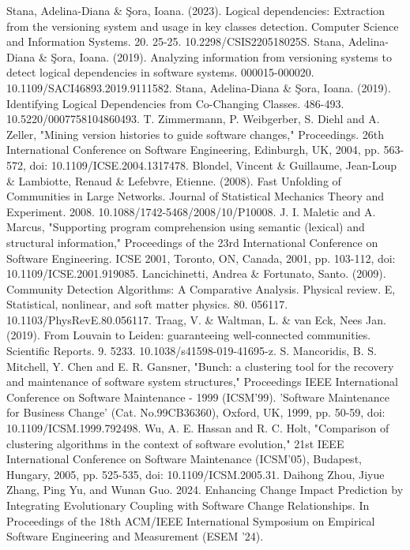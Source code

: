 \documentclass{ieeeaccess}
\begin{document}
\begin{thebibliography}{00}
 Stana, Adelina-Diana \& Şora, Ioana. (2023). Logical dependencies: Extraction from the versioning system and usage in key classes detection. Computer Science and Information Systems. 20. 25-25. 10.2298/CSIS220518025S. 
 Stana, Adelina-Diana \& Şora, Ioana. (2019). Analyzing information from versioning systems to detect logical dependencies in software systems. 000015-000020. 10.1109/SACI46893.2019.9111582. 
 Stana, Adelina-Diana \& Şora, Ioana. (2019). Identifying Logical Dependencies from Co-Changing Classes. 486-493. 10.5220/0007758104860493. 
 T. Zimmermann, P. Weibgerber, S. Diehl and A. Zeller, "Mining version histories to guide software changes," Proceedings. 26th International Conference on Software Engineering, Edinburgh, UK, 2004, pp. 563-572, doi: 10.1109/ICSE.2004.1317478.
 Blondel, Vincent \& Guillaume, Jean-Loup \& Lambiotte, Renaud \& Lefebvre, Etienne. (2008). Fast Unfolding of Communities in Large Networks. Journal of Statistical Mechanics Theory and Experiment. 2008. 10.1088/1742-5468/2008/10/P10008. 
 J. I. Maletic and A. Marcus, "Supporting program comprehension using semantic (lexical) and structural information," Proceedings of the 23rd International Conference on Software Engineering. ICSE 2001, Toronto, ON, Canada, 2001, pp. 103-112, doi: 10.1109/ICSE.2001.919085.
 Lancichinetti, Andrea \& Fortunato, Santo. (2009). Community Detection Algorithms: A Comparative Analysis. Physical review. E, Statistical, nonlinear, and soft matter physics. 80. 056117. 10.1103/PhysRevE.80.056117. 
 Traag, V. \& Waltman, L. \& van Eck, Nees Jan. (2019). From Louvain to Leiden: guaranteeing well-connected communities. Scientific Reports. 9. 5233. 10.1038/s41598-019-41695-z. 
 S. Mancoridis, B. S. Mitchell, Y. Chen and E. R. Gansner, "Bunch: a clustering tool for the recovery and maintenance of software system structures," Proceedings IEEE International Conference on Software Maintenance - 1999 (ICSM'99). 'Software Maintenance for Business Change' (Cat. No.99CB36360), Oxford, UK, 1999, pp. 50-59, doi: 10.1109/ICSM.1999.792498.
 Wu, A. E. Hassan and R. C. Holt, "Comparison of clustering algorithms in the context of software evolution," 21st IEEE International Conference on Software Maintenance (ICSM'05), Budapest, Hungary, 2005, pp. 525-535, doi: 10.1109/ICSM.2005.31.
 Daihong Zhou, Jiyue Zhang, Ping Yu, and Wunan Guo. 2024. Enhancing Change Impact Prediction by Integrating Evolutionary Coupling with Software Change Relationships. In Proceedings of the 18th ACM/IEEE International Symposium on Empirical Software Engineering and Measurement (ESEM '24).

\end{thebibliography}
\end{document}
